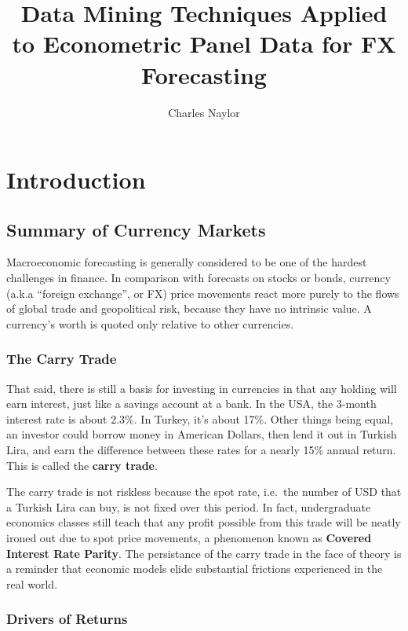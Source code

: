 \documentclass[]{article}
\title{Data Mining Techniques Applied to Econometric Panel Data for FX
Forecasting}
\author{Charles Naylor}
\date{}
\begin{document}
\maketitle

{
\setcounter{tocdepth}{2}
\tableofcontents
}
\section{Introduction}\label{introduction}

\subsection{Summary of Currency
Markets}\label{summary-of-currency-markets}

Macroeconomic forecasting is generally considered to be one of the
hardest challenges in finance. In comparison with forecasts on stocks or
bonds, currency (a.k.a ``foreign exchange'', or FX) price movements
react more purely to the flows of global trade and geopolitical risk,
because they have no intrinsic value. A currency's worth is quoted only
relative to other currencies.

\subsubsection{The Carry Trade}\label{the-carry-trade}

That said, there is still a basis for investing in currencies in that
any holding will earn interest, just like a savings account at a bank.
In the USA, the 3-month interest rate is about 2.3\%. In Turkey, it's
about 17\%. Other things being equal, an investor could borrow money in
American Dollars, then lend it out in Turkish Lira, and earn the
difference between these rates for a nearly 15\% annual return. This is
called the \textbf{carry trade}.

The carry trade is not riskless because the spot rate, i.e.~the number
of USD that a Turkish Lira can buy, is not fixed over this period. In
fact, undergraduate economics classes still teach that any profit
possible from this trade will be neatly ironed out due to spot price
movements, a phenomenon known as \textbf{Covered Interest Rate Parity}.
The persistance of the carry trade in the face of theory is a reminder
that economic models elide substantial frictions experienced in the real
world.

\subsubsection{Drivers of Returns}\label{drivers-of-returns}
\end{document}
